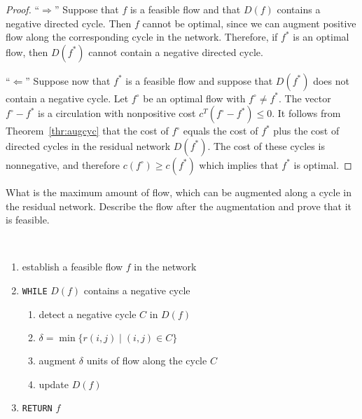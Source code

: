   \begin{proof}
    

  ``$\Rightarrow$'' Suppose that $f$ is a feasible flow and that $D(f)$ contains
  a negative directed cycle. Then $f$ cannot be optimal, since we can
  augment positive flow along the corresponding cycle in the
  network. Therefore, if $f^*$ is an optimal flow, then $D(f^*)$
  cannot contain a negative directed cycle. 

  ``$\Leftarrow$'' Suppose now that $f^*$ is a feasible flow and suppose that
  $D(f^*)$ does not contain a negative cycle. Let $f^\circ$ be an optimal
  flow with $f^\circ \neq f^*$. The vector $f^\circ-f^*$ is a circulation with
  nonpositive cost $c^T(f^\circ-f^*) \leq0$. It follows from
  Theorem~\ref{thr:augcyc} that the cost of $f^\circ$ equals the cost of
  $f^*$ plus  the cost of directed cycles in the residual network
  $D(f^*)$.  The cost of these cycles is nonnegative, and therefore
  $c(f^\circ) \geq c(f^*)$ which implies that $f^*$ is optimal. 

\end{proof}

\begin{exercise}
  What is the maximum amount of flow, which can be augmented along a
  cycle in the residual network. Describe the flow after the
  augmentation and prove that it is feasible. 
\end{exercise}









\begin{algorithm}
  \label{alg:1}
  ~\\
  \begin{enumerate}
  \item  establish a feasible flow $f$ in the network
  \item {\tt WHILE} $D(f)$ contains a negative cycle
    \begin{enumerate}
    \item  detect a negative cycle $C$ in $D(f)$
    \item $\delta=\min\{r{(i,j)} \mid (i,j) \in C\}$
    \item augment $\delta$ units of flow along the cycle $C$
    \item update $D(f)$
    \end{enumerate}
  \item {\tt RETURN}  $f$
  \end{enumerate}
\end{algorithm}


